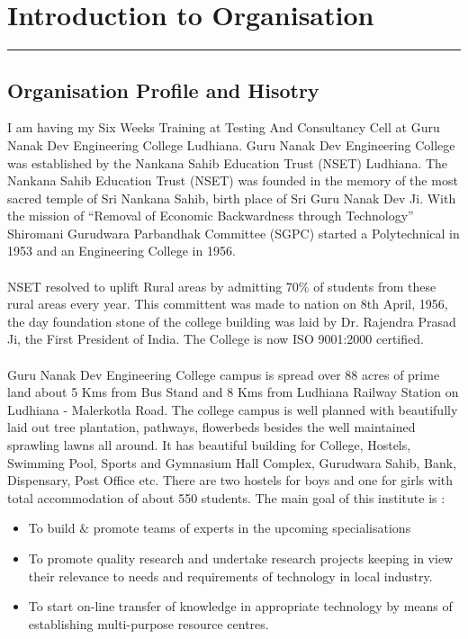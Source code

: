 \chapter{Introduction to Organisation}\hrule
\label{Chapter:1}
\section {Organisation Profile and Hisotry}
I am having my Six Weeks Training at Testing And Consultancy Cell at Guru Nanak Dev
Engineering College Ludhiana. Guru Nanak Dev Engineering College was established by the
Nankana Sahib Education Trust (NSET) Ludhiana. The Nankana Sahib Education Trust (NSET)
was founded in the memory of the most sacred temple of Sri Nankana Sahib, birth place of Sri Guru
Nanak Dev Ji. With the mission of ``Removal of Economic Backwardness through Technology''
Shiromani Gurudwara Parbandhak Committee (SGPC) started a Polytechnical in 1953 and an
Engineering College in 1956.\\
\\
NSET resolved to uplift Rural areas by admitting 70\% of students from these rural areas every year.
This committent was made to nation on 8th April, 1956, the day foundation stone of the college
building was laid by Dr. Rajendra Prasad Ji, the First President of India. The College is now ISO
9001:2000 certified.\\
\\
Guru Nanak Dev Engineering College campus is spread over 88 acres of prime land about 5 Kms
from Bus Stand and 8 Kms from Ludhiana Railway Station on Ludhiana - Malerkotla Road. The
college campus is well planned with beautifully laid out tree plantation, pathways, flowerbeds
besides the well maintained sprawling lawns all around. It has beautiful building for College,
Hostels, Swimming Pool, Sports and Gymnasium Hall Complex, Gurudwara Sahib, Bank,
Dispensary, Post Office etc. There are two hostels for boys and one for girls with total
accommodation of about 550 students. The main goal of this institute is :
\begin{itemize}
	\item To build \& promote teams of experts in the upcoming specialisations
	\item To promote quality research and undertake research projects keeping in view their
	relevance to needs and requirements of technology in local industry.
	\item To start on-line transfer of knowledge in appropriate technology by means of establishing
	multi-purpose resource centres.
\end{itemize}
